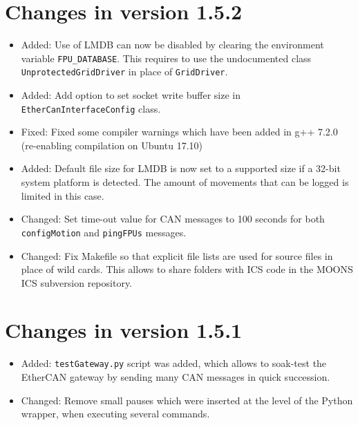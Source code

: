 \documentclass[fontsize=12,a4paper]{scrreprt}
\begin{document}
\section*{Changes in version 1.5.2}
\begin{itemize}
\item Added: Use of LMDB can now be disabled by clearing the
  environment variable \texttt{FPU\_DATABASE}.  This requires to use
  the undocumented class \texttt{UnprotectedGridDriver} in place of
  \texttt{GridDriver}.

\item Added: Add option to set socket write buffer size in \texttt{EtherCanInterfaceConfig} class.

\item Fixed: Fixed some compiler warnings which have been added in g++ 7.2.0 (re-enabling compilation on Ubuntu 17.10)

\item Added: Default file size for LMDB is now set to a supported size if a 32-bit system platform is detected.
  The amount of movements that can be logged is limited in this case.

\item Changed: Set time-out value for CAN messages to 100 seconds for
  both \texttt{configMotion} and \texttt{pingFPUs} messages.

\item Changed: Fix Makefile so that explicit file lists are used for
  source files in place of wild cards. This allows to share folders
  with ICS code in the MOONS ICS subversion repository.

\end{itemize}

\section*{Changes in version 1.5.1}
\begin{itemize}

\item  Added: \texttt{testGateway.py}  script was added, which allows to soak-test the
  EtherCAN gateway by sending many CAN messages in quick succession.

\item Changed: Remove small pauses which were inserted at the level of
  the Python wrapper, when executing several commands.

\end{itemize}
\end{document}
